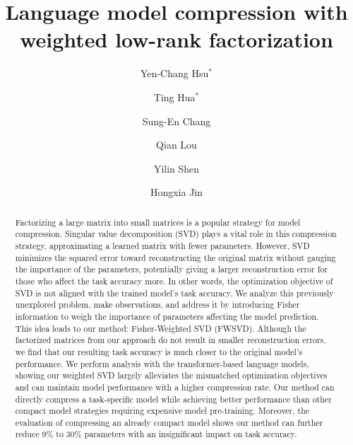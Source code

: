 \documentclass{article} %
\title{Language model compression with weighted low-rank factorization}
\author[1]{Yen-Chang Hsu$^*$}
\author[1]{Ting Hua$^*$}
\author[2]{Sung-En Chang}
\author[1]{ Qian Lou}
\author[1]{Yilin Shen}
\author[1]{Hongxia Jin}
\affil[1]{Samsung Research America }
\affil[2]{Northeastern University }
\affil[ ]{ \par  \{\tt yenchang.hsu, ting.hua, qian.lou, yilin.shen, hongxia.jin\}@samsung.com,\{\tt chang.sun\}@northeastern.edu}
\newcommand{\yilin}[1]{}
\newcommand{\yilin}[1]{{\color{red}{(yilin: #1)}}}
\begin{document}
\maketitle

\def\thefootnote{*}\def\thefootnote{\arabic{footnote}}

\begin{abstract}
Factorizing a large matrix into small matrices is a popular strategy for model compression. Singular value decomposition (SVD) plays a vital role in this compression strategy, approximating a learned matrix with fewer parameters. However, SVD minimizes the squared error toward reconstructing the original matrix without gauging the importance of the parameters, potentially giving a larger reconstruction error for those who affect the task accuracy more. In other words, the optimization objective of SVD is not aligned with the trained model's task accuracy. We analyze this previously unexplored problem, make observations, and address it by introducing Fisher information to weigh the importance of parameters affecting the model prediction. This idea leads to our method: Fisher-Weighted SVD (FWSVD). Although the factorized matrices from our approach do not result in smaller reconstruction errors, we find that our resulting task accuracy is much closer to the original model's performance. We perform analysis with the transformer-based language models, showing our weighted SVD largely alleviates the mismatched optimization objectives and can maintain model performance with a higher compression rate. Our method can directly compress a task-specific model while achieving better performance than other compact model strategies requiring expensive model pre-training.
Moreover, the evaluation of compressing an already compact model shows our method can further reduce 9\% to 30\% parameters with an insignificant impact on task accuracy.
\end{abstract}






% 





 
\end{document}

